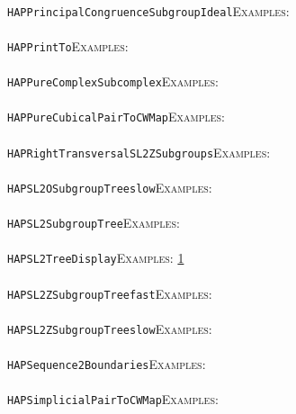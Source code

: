 \documentclass[a4paper,11pt]{report}
\begin{document}
{{ \\
 \texttt{HAP{\textunderscore}PrincipalCongruenceSubgroupIdeal}{\nobreakspace}{\nobreakspace}{\nobreakspace}{\nobreakspace}\textsc{Examples:} \\
 \\
 \texttt{HAP{\textunderscore}PrintTo}{\nobreakspace}{\nobreakspace}{\nobreakspace}{\nobreakspace}\textsc{Examples:} \\
 \\
 \texttt{HAP{\textunderscore}PureComplexSubcomplex}{\nobreakspace}{\nobreakspace}{\nobreakspace}{\nobreakspace}\textsc{Examples:} \\
 \\
 \texttt{HAP{\textunderscore}PureCubicalPairToCWMap}{\nobreakspace}{\nobreakspace}{\nobreakspace}{\nobreakspace}\textsc{Examples:} \\
 \\
 \texttt{HAP{\textunderscore}RightTransversalSL2ZSubgroups}{\nobreakspace}{\nobreakspace}{\nobreakspace}{\nobreakspace}\textsc{Examples:} \\
 \\
 \texttt{HAP{\textunderscore}SL2OSubgroupTree{\textunderscore}slow}{\nobreakspace}{\nobreakspace}{\nobreakspace}{\nobreakspace}\textsc{Examples:} \\
 \\
 \texttt{HAP{\textunderscore}SL2SubgroupTree}{\nobreakspace}{\nobreakspace}{\nobreakspace}{\nobreakspace}\textsc{Examples:} \\
 \\
 \texttt{HAP{\textunderscore}SL2TreeDisplay}{\nobreakspace}{\nobreakspace}{\nobreakspace}{\nobreakspace}\textsc{Examples:} \href{tutorial/chap10.html} {1}{\nobreakspace} \\
 \\
 \texttt{HAP{\textunderscore}SL2ZSubgroupTree{\textunderscore}fast}{\nobreakspace}{\nobreakspace}{\nobreakspace}{\nobreakspace}\textsc{Examples:} \\
 \\
 \texttt{HAP{\textunderscore}SL2ZSubgroupTree{\textunderscore}slow}{\nobreakspace}{\nobreakspace}{\nobreakspace}{\nobreakspace}\textsc{Examples:} \\
 \\
 \texttt{HAP{\textunderscore}Sequence2Boundaries}{\nobreakspace}{\nobreakspace}{\nobreakspace}{\nobreakspace}\textsc{Examples:} \\
 \\
 \texttt{HAP{\textunderscore}SimplicialPairToCWMap}{\nobreakspace}{\nobreakspace}{\nobreakspace}{\nobreakspace}\textsc{Examples:} \\
}}
\end{document}
